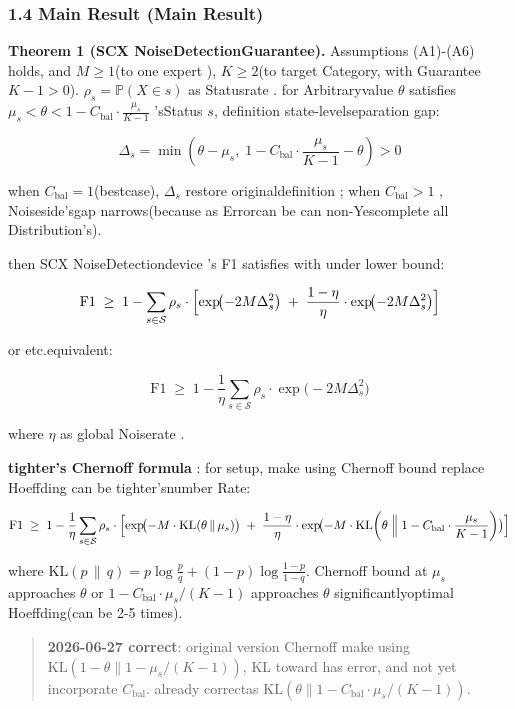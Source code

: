 \documentclass[
  12pt,
]{article}
\begin{document}
\subsubsection{1.4 Main Result (Main
Result)}\label{ux4e3bux5b9aux7406-main-result}

\textbf{Theorem 1 (SCX NoiseDetectionGuarantee).} Assumptions (A1)-(A6) holds, and 
\(M \geq 1\)(to one expert ), \(K \geq 2\)(to target Category, with Guarantee
\(K-1 > 0\)).  \(\rho_s = \mathbb{P}(X \in s)\)
as Statusrate . for Arbitraryvalue  \(\theta\) satisfies 
\(\mu_s < \theta < 1 - C_{\text{bal}} \cdot \frac{\mu_s}{K-1}\) 'sStatus
\(s\), definition state-levelseparation gap: 

\[\Delta_s = \min\left(\theta - \mu_s,\; 1 - C_{\text{bal}} \cdot \frac{\mu_s}{K-1} - \theta\right) > 0\]

when  \(C_{\text{bal}} = 1\)(bestcase), \(\Delta_s\) restore originaldefinition ; when 
\(C_{\text{bal}} > 1\)
, Noiseside'sgap narrows(because as Errorcan be can non-Yescomplete all Distribution's). 

then  SCX NoiseDetectiondevice 's F1 satisfies with under lower bound: 

\[\text{F1} \;\geq\; 1 - \sum_{s \in \mathcal{S}} \rho_s \cdot \Bigl[ \exp\!\bigl(-2M\Delta_s^2\bigr) \;+\; \frac{1-\eta}{\eta} \cdot \exp\!\bigl(-2M\Delta_s^2\bigr) \Bigr]\]

or etc.equivalent: 

\[\text{F1} \;\geq\; 1 - \frac{1}{\eta} \sum_{s \in \mathcal{S}} \rho_s \cdot \exp\!\bigl(-2M\Delta_s^2\bigr)\]

where \(\eta\) as global Noiserate . 

\textbf{tighter's Chernoff formula }: for setup, make using  Chernoff bound replace
Hoeffding can be tighter'snumber Rate: 

\[\text{F1} \;\geq\; 1 - \frac{1}{\eta} \sum_{s \in \mathcal{S}} \rho_s \cdot \Bigl[ \exp\!\bigl(-M \cdot \text{KL}(\theta \,\|\, \mu_s)\bigr) \;+\; \frac{1-\eta}{\eta} \cdot \exp\!\bigl(-M \cdot \text{KL}\!\left(\theta \;\Big\|\; 1 - C_{\text{bal}} \cdot \frac{\mu_s}{K-1}\right)\bigr) \Bigr]\]

where
\(\text{KL}(p \,\|\, q) = p \log\frac{p}{q} + (1-p)\log\frac{1-p}{1-q}\). Chernoff
bound at  \(\mu_s\) approaches \(\theta\) or 
\(1 - C_{\text{bal}} \cdot \mu_s/(K-1)\) approaches \(\theta\) significantlyoptimal
Hoeffding(can be  2-5 times). 

\begin{quote}
\textbf{2026-06-27 correct}: original version Chernoff make using 
\(\text{KL}(1-\theta \| 1 - \mu_s/(K-1))\), KL toward has error, and not yet incorporate
\(C_{\text{bal}}\). already correctas 
\(\text{KL}(\theta \| 1 - C_{\text{bal}} \cdot \mu_s/(K-1))\). 
\end{quote}
\end{document}
